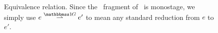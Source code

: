 \begin{figure}[t]
\begin{abstrsyn}
\begin{mathpar}
\end{mathpar}
\end{abstrsyn}
\caption{Equivalence relation. Since the \bbonep\ fragment of \lang\ is monostage, we simply use $e \betastepsym \bbonep e'$ to mean any standard reduction from $e$ to $e'$.}
\label{fig:equiv}
\end{figure}

